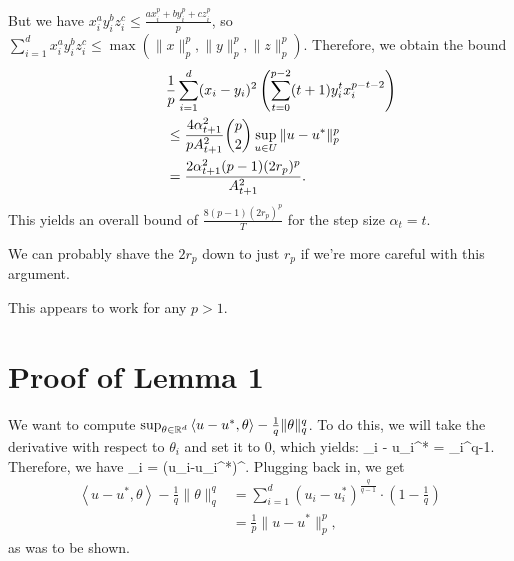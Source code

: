 \documentclass[reqno,oneside,a4paper]{amsart}
\newcommand{\ip}[2]{\left\langle #1, #2 \right\rangle}
\def\[#1\]{\begin{align}#1\end{align}}
\begin{document}
But we have $x_i^ay_i^bz_i^c \leq \frac{ax_i^p+by_i^p+cz_i^p}{p}$, so $\sum_{i=1}^d x_i^ay_i^bz_i^c \leq \max(\|x\|_p^p, \|y\|_p^p, \|z\|_p^p)$.
Therefore, we obtain the bound
\begin{align*}
\lefteqn{\frac{1}{p} \sum_{i=1}^d (x_i-y_i)^2 \left(\sum_{t=0}^{p-2} (t+1)y_i^{t}x_i^{p-t-2}\right)} \\
 &\leq \frac{4\alpha_{t+1}^2}{p A_{t+1}^2}\binom{p}{2} \sup_{u \in U} \|u-u^*\|_p^p \\
 &= \frac{2\alpha_{t+1}^2(p-1)(2r_p)^p}{A_{t+1}^2}.
\end{align*}
This yields an overall bound of $\frac{8(p-1)(2r_p)^p}{T}$ for the step size $\alpha_t = t$.
\begin{remark}
We can probably shave the $2r_p$ down to just $r_p$ if we're more careful with this argument.
\end{remark}
\begin{remark}
This appears to work for any $p > 1$.
\end{remark}

\section{Proof of Lemma 1}
We want to compute $\sup_{\theta \in \bR^d} \ip{u-u^*}{\theta} - \frac{1}{q} \|\theta\|_q^q$. To do this, 
we will take the derivative with respect to $\theta_i$ and set it to $0$, which yields:
\[ u_i - u_i^* = \theta_i^{q-1}. \]
Therefore, we have
\[ \theta_i = \left(u_i-u_i^*\right)^{}. \]
Plugging back in, we get
\begin{align*}
\ip{u-u^*}{\theta} - \frac{1}{q} \|\theta\|_q^q &= \sum_{i=1}^d (u_i-u_i^*)^{\frac{q}{q-1}} \cdot \left(1-\frac{1}{q}\right) \\
 &= \frac{1}{p} \|u-u^*\|_p^p,
\end{align*}
as was to be shown.
\end{document}
